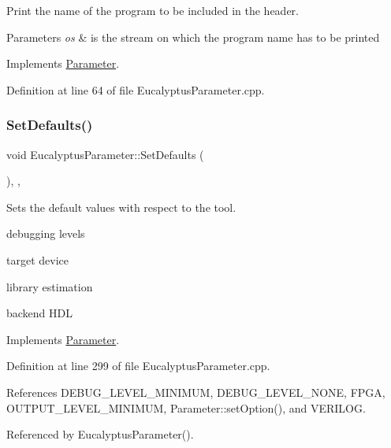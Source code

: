 Print the name of the program to be included in the header. 


\begin{DoxyParams}{Parameters}
{\em os} & is the stream on which the program name has to be printed \\
\hline
\end{DoxyParams}


Implements \hyperlink{classParameter_afe71fca464da99b2ff720d3ad15df051}{Parameter}.



Definition at line 64 of file Eucalyptus\+Parameter.\+cpp.

\mbox{\label{classEucalyptusParameter_a6a12b064281764f529619b34b732a68d}} 
\subsubsection{\texorpdfstring{Set\+Defaults()}{SetDefaults()}}
{\footnotesize\ttfamily void Eucalyptus\+Parameter\+::\+Set\+Defaults (\begin{DoxyParamCaption}{ }\end{DoxyParamCaption})\hspace{0.3cm}{\ttfamily [override]}, {\ttfamily [private]}, {\ttfamily [virtual]}}



Sets the default values with respect to the tool. 

debugging levels

target device

library estimation

backend H\+DL 

Implements \hyperlink{classParameter_af2bbff2bbfee25d348bd2f0d796d7b3f}{Parameter}.



Definition at line 299 of file Eucalyptus\+Parameter.\+cpp.



References D\+E\+B\+U\+G\+\_\+\+L\+E\+V\+E\+L\+\_\+\+M\+I\+N\+I\+M\+UM, D\+E\+B\+U\+G\+\_\+\+L\+E\+V\+E\+L\+\_\+\+N\+O\+NE, F\+P\+GA, O\+U\+T\+P\+U\+T\+\_\+\+L\+E\+V\+E\+L\+\_\+\+M\+I\+N\+I\+M\+UM, Parameter\+::set\+Option(), and V\+E\+R\+I\+L\+OG.



Referenced by Eucalyptus\+Parameter().

